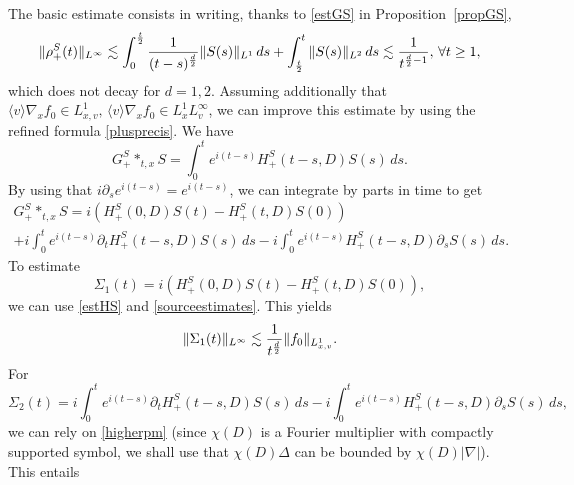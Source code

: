 \documentclass[11pt]{amsart}
\numberwithin{equation}{section}
\begin{document}
          
        The basic estimate consists in writing, thanks to \eqref{estGS} in Proposition~\ref{propGS},
        $$ \| \rho_+^S (t) \|_{L^\infty} \lesssim  \int_{0}^{t \over 2} { 1 \over (t-s)^{d \over 2}}
         \|S(s) \|_{L^1} \, ds + \int_{t\over 2}^t \|S(s) \|_{L^2} \, ds
          \lesssim { 1 \over t^{{d \over 2}- 1}}, \, \forall t \geq 1 ,$$
which does not decay for $d=1,2$. 
     Assuming additionally that  $ \langle v\rangle  \nabla_{x} f_{0} \in L^1_{x,v},  \,  \langle v\rangle\nabla_{x}  f_{0} \in L^1_{x} L^\infty_{v}$, we can improve this estimate by using the refined formula \eqref{plusprecis}.
      We have 
      $$ G^S_{+}*_{t,x} S= \int_{0}^t e^{i (t-s)} H^S_{+}(t-s, D) S(s)\, ds.$$
      By using that $ { i}\partial_{s}e^{i(t-s)} = e^{i (t-s)}$, we can integrate by parts in time to get
      \begin{multline*}
      G^S_{+}*_{t,x}  S= i  (H^S_{+}(0, D) S(t) - H^S_{+}(t, D)S(0)) \\
     +    i   \int_{0}^t e^{i (t-s)} \partial_{t}H^S_{+}(t-s, D) S(s)\, ds - i \int_{0}^t e^{i(t-s)}H^S_{+}(t-s, D) \partial_{s}S(s)\, ds.
       \end{multline*}    
     To estimate 
     $$\Sigma_{1}(t) =  i  (H^S_{+}(0, D) S(t) - H^S_{+}(t, D)S(0)), $$ we can use \eqref{estHS}
      and \eqref{sourceestimates}.
       This yields
       $$ \| \Sigma_{1}(t) \|_{L^\infty} \lesssim { 1 \over  t^{{d \over 2}}}  \|  f_{0}\|_{L^1_{x,v}}.$$
        For 
        $$\Sigma_{2}(t)=  i   \int_{0}^t e^{i (t-s)} \partial_{t}H^S_{+}(t-s, D) S(s)\, ds - i \int_{0}^t e^{i(t-s)}H^S_{+}(t-s, D) \partial_{s}S(s)\, ds,$$ 
        we can rely on \eqref{higherpm} (since $\chi(D)$ is a  Fourier multiplier with compactly supported
      symbol, we shall  use that   $\chi(D) \Delta$ can be bounded by $ \chi(D) |\nabla |$). This entails
\end{document}
